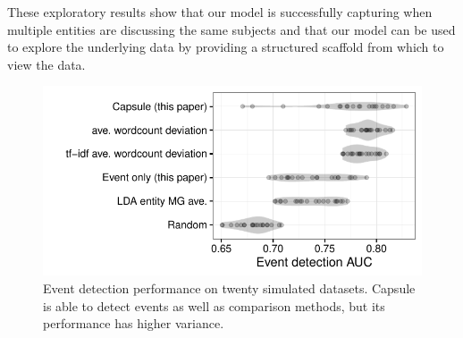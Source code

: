 These exploratory results show that our model is successfully capturing when multiple entities are discussing the same subjects and that our model can be used to explore the underlying data by providing a structured scaffold from which to view the data.


\begin{figure}[h]
\centering
\includegraphics[width=\linewidth]{fig/sim_eventdetect.pdf}
\caption{Event detection performance on twenty simulated datasets.  Capsule is able to detect events as well as comparison methods, but its performance has higher variance.}
\label{fig:sim_eventdetect}
\end{figure}

